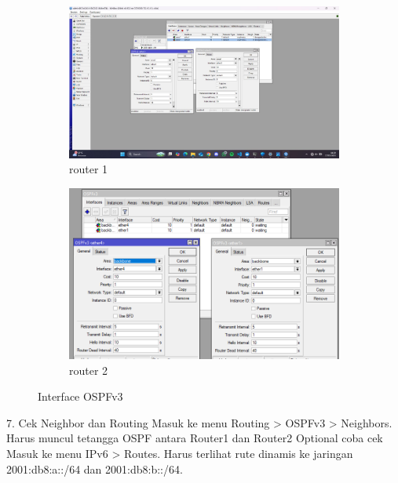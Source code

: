 \begin{figure}[H]
    \centering
    \begin{subfigure}[b]{0.3\linewidth}
      \centering
      \includegraphics[width=\linewidth]{image/dinamis6.jpg}
      \caption{router 1}
    \end{subfigure}
    \hspace{1cm}
    \begin{subfigure}[b]{0.3\linewidth}
      \centering
      \includegraphics[width=\linewidth]{image/dinamis5.png}
      \caption{router 2}
    \end{subfigure}
    \caption{Interface OSPFv3}
\end{figure}
7. Cek Neighbor dan Routing Masuk ke menu Routing > OSPFv3 > Neighbors. Harus muncul tetangga OSPF antara Router1 dan Router2 Optional coba cek Masuk ke menu IPv6 > Routes. Harus terlihat rute dinamis ke jaringan 2001:db8:a::/64 dan 2001:db8:b::/64.

